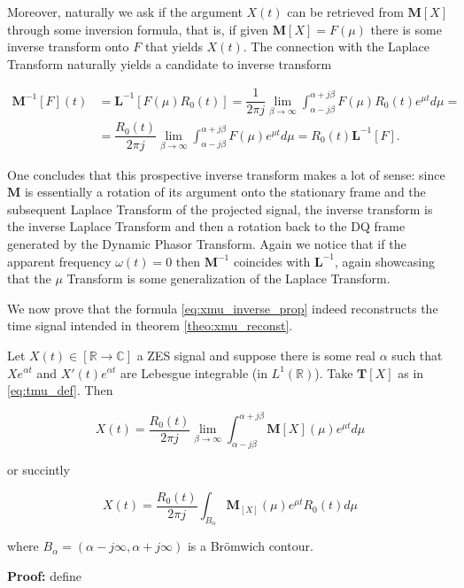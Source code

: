 	Moreover, naturally we ask if the argument $X(t)$ can be retrieved from $\mathbf{M}\left[X\right]$ through some inversion formula, that is, if given $\mathbf{M}\left[X\right] = F\left(\mu\right)$ there is some inverse transform onto $F$ that yields $X(t)$. The connection with the Laplace Transform naturally yields a candidate to inverse transform

\begin{align}
	\mathbf{M}^{-1}\left[F\right](t) &= \mathbf{L}^{-1}\left[F\left(\mu\right)R_0(t)\right] = \dfrac{1}{2\pi j}\lim_{\beta\to\infty} \int_{\alpha- j\beta}^{\alpha + j\beta} F\left(\mu\right) R_0(t) e^{\mu  t} d\mu = \nonumber\\[3mm] &= \dfrac{R_0(t)}{2\pi j}\lim_{\beta\to\infty} \int_{\alpha- j\beta}^{\alpha + j\beta} F\left(\mu\right) e^{\mu  t} d\mu = R_0(t)\mathbf{L}^{-1}\left[F\right].\label{eq:xmu_inverse_prop}
\end{align}

	One concludes that this prospective inverse transform makes a lot of sense: since $\mathbf{M}$ is essentially a rotation of its argument onto the stationary frame and the subsequent Laplace Transform of the projected signal, the inverse transform is the inverse Laplace Transform and then a rotation back to the DQ frame generated by the Dynamic Phasor Transform. Again we notice that if the apparent frequency $\omega(t) = 0$ then $\mathbf{M}^{-1}$ coincides with $\mathbf{L}^{-1}$, again showcasing that the $\mu$ Transform is some generalization of the Laplace Transform.

	We now prove that the formula \ref{eq:xmu_inverse_prop} indeed reconstructs the time signal intended in theorem \ref{theo:xmu_reconst}. 

\begin{theorem}\label{theo:xmu_reconst} %
	Let $X(t)\in\left[\mathbb{R}\to\mathbb{C}\right]$ a ZES signal and suppose there is some real $\alpha$ such that $Xe^{\alpha t}$ and $X'(t)e^{\alpha t}$ are Lebesgue integrable (in $L^1\left(\mathbb{R}\right)$). Take $\mathbf{T}\left[X\right]$ as in \eqref{eq:tmu_def}. Then 

	\begin{equation} X(t) = \dfrac{R_0(t)}{2\pi j}\lim_{\beta\to\infty} \int_{\alpha- j\beta}^{\alpha + j\beta} \mathbf{M} \left[X\right]\left(\mu\right) e^{\mu  t} d\mu \label{eq:xmu_inverse}\end{equation}

	\noindent or succintly
        
	\begin{equation} X(t) = \dfrac{R_0(t)}{2\pi j}\int_{B_\alpha} \mathbf{M}_{\left[X\right]}\left(\mu\right) e^{\mu  t} R_0\left(t\right) d\mu \label{eq:xmu_inverse_brom}\end{equation}
        
	\noindent where $B_\alpha = \left(\alpha - j\infty,\alpha + j\infty\right)$ is a Brömwich contour.
\end{theorem}
\textbf{Proof:} define

